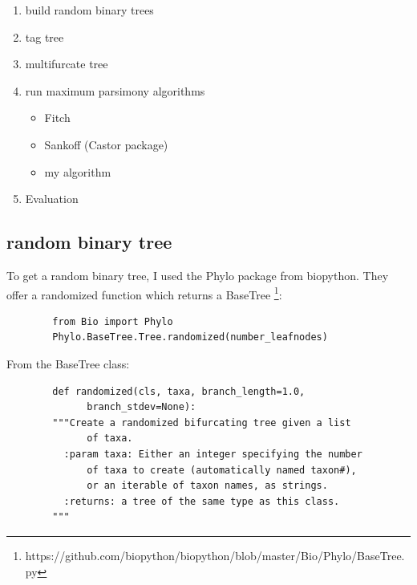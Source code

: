     \begin{enumerate}
      \item build random binary trees
      \item tag tree
      \item multifurcate tree
      \item run maximum parsimony algorithms
      \begin{itemize}
        \item Fitch
        \item Sankoff (Castor package)
        \item my algorithm
      \end{itemize}
      \item Evaluation
    \end{enumerate}

    \subsection{random binary tree}
      To get a random binary tree, I used the Phylo package from biopython. They offer a randomized
        function which returns a BaseTree \footnote{
          https://github.com/biopython/biopython/blob/master/Bio/Phylo/BaseTree.py
        }:
      \begin{lstlisting}
        from Bio import Phylo
        Phylo.BaseTree.Tree.randomized(number_leafnodes)
      \end{lstlisting}
      From the BaseTree class:
      \begin{lstlisting}
        def randomized(cls, taxa, branch_length=1.0, 
              branch_stdev=None):
        """Create a randomized bifurcating tree given a list
              of taxa.
          :param taxa: Either an integer specifying the number
              of taxa to create (automatically named taxon#), 
              or an iterable of taxon names, as strings.
          :returns: a tree of the same type as this class.
        """
      \end{lstlisting}

